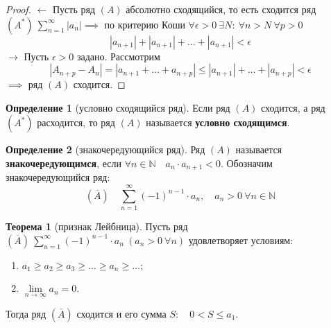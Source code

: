 \documentclass{report}
\theoremstyle{definition}
\newtheorem{definition}{Определение}[section]
\newtheorem{theorem}{Теорема}[section]
\begin{document}
\begin{proof}
  $\leftarrow$ Пусть ряд $(A)$ абсолютно сходящийся, то есть сходится ряд $(A^*) \ \sum_{n=1}^{\infty}|a_n| \implies$ по критерию Коши $\forall \epsilon > 0 \ \exists N: \ \forall n > N \ \forall p > 0$
  \begin{equation*}
    |a_{n+1}| + |a_{n+1}| + \ldots + |a_{n+1}| < \epsilon
  \end{equation*}
  $\rightarrow$ Пусть $\epsilon > 0$ задано. Рассмотрим
  \begin{equation*}
    |A_{n+p} - A_n| = |a_{n+1} + \ldots + a_{n+p}| \leqslant |a_{n+1}| + \ldots + |a_{n+p}| < \epsilon
  \end{equation*}
  $\implies$ ряд $(A)$ сходится.
\end{proof}

\begin{definition}[условно сходящийся ряд]
  Если ряд $(A)$ сходится, а ряд $(A^*)$ расходится, то ряд $(A)$ называется \textbf{условно сходящимся}.
\end{definition}

\begin{definition}[знакочередующийся ряд]
  Ряд $(A)$ называется \textbf{знакочередующимся}, если $\forall n \in \mathbb{N} \quad a_n \cdot a_{n+1} < 0$. Обозначим знакочередующийся ряд:
  \begin{equation*}
    (\overline{A}) \quad \sum_{n=1}^{\infty}(-1)^{n-1}\cdot a_n, \quad a_n > 0 \ \forall n \in\mathbb{N}
  \end{equation*}
\end{definition}

\begin{theorem}[признак Лейбница]
  Пусть ряд $(\overline{A}) \ \sum_{n=1}^{\infty}(-1)^{n-1}\cdot a_n \ (a_n > 0 \ \forall n)$ удовлетворяет условиям:
  \begin{enumerate}
    \item $a_1 \geqslant a_2 \geqslant a_3 \geqslant \ldots \geqslant a_n \geqslant \ldots$;
    \item $\underset{n\rightarrow\infty}{\lim} a_n = 0$.
  \end{enumerate}

  Тогда ряд $(\overline{A})$ сходится и его сумма $S: \quad 0 < S \leqslant a_1$.
\end{theorem}
\end{document}
